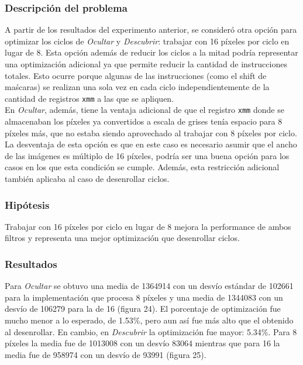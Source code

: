 \documentclass[a4paper]{article}
\begin{document}
\subsubsection{Descripción del problema}
A partir de los resultados del experimento anterior, se consideró otra opción para optimizar los ciclos de \textit{Ocultar} y \textit{Descubrir}: trabajar con 16 píxeles por ciclo en lugar de 8. Esta opción además de reducir los ciclos a la mitad podría representar una optimización adicional ya que permite reducir la cantidad de instrucciones totales. Esto ocurre porque algunas de las instrucciones (como el shift de maścaras) se realizan una sola vez en cada ciclo independientemente de la cantidad de registros {\tt xmm} a las que se apliquen. \\
En \textit{Ocultar}, además, tiene la ventaja adicional de que el registro {\tt xmm} donde se almacenaban los píxeles ya convertidos a escala de grises tenía espacio para 8 píxeles más, que no estaba siendo aprovechado al trabajar con 8 píxeles por ciclo. \\
La desventaja de esta opción es que en este caso es necesario asumir que el ancho de las imágenes es múltiplo de 16 píxeles, podría ser una buena opción para los casos en los que esta condición se cumple. Además, esta restricción adicional también aplicaba al caso de desenrollar ciclos.

\subsubsection{Hipótesis}
Trabajar con 16 píxeles por ciclo en lugar de 8 mejora la performance de ambos filtros y representa una mejor optimización que desenrollar ciclos.

\subsubsection{Resultados}
Para \textit{Ocultar} se obtuvo una media de 1364914 con un desvío estándar de 102661 para la implementación que procesa 8 píxeles y una media de 1344083 con un desvío de 106279 para la de 16 (figura 24). El porcentaje de optimización fue mucho menor a lo esperado, de 1.53\%, pero aun así fue más alto que el obtenido al desenrollar. En cambio, en \textit{Descubrir} la optimización fue mayor: 5.34\%. Para 8 píxeles la media fue de 1013008 con un desvío 83064 mientras que para 16 la media fue de 958974 con un desvío de 93991 (figura 25).
\end{document}
